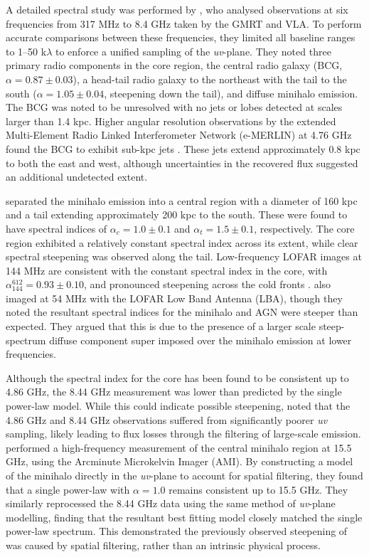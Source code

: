 A detailed spectral study was performed by \citet{Giacintucci2014a}, who analysed observations at six frequencies from 317 MHz to 8.4 GHz taken by the GMRT and VLA. To perform accurate comparisons between these frequencies, they limited all baseline ranges to 1--50 k$\lambda$ to enforce a unified sampling of the \textit{uv}-plane. They noted three primary radio components in the core region, the central radio galaxy (BCG, $\alpha = 0.87\pm0.03$), a head-tail radio galaxy to the northeast with the tail to the south ($\alpha = 1.05\pm0.04$, steepening down the tail), and diffuse minihalo emission. The BCG was noted to be unresolved with no jets or lobes detected at scales larger than 1.4 kpc. Higher angular resolution observations by the extended Multi-Element Radio Linked Interferometer Network (e-MERLIN) at 4.76 GHz found the BCG to exhibit sub-kpc jets \citep{Perrott2023}. These jets extend approximately 0.8 kpc to both the east and west, although uncertainties in the recovered flux suggested an additional undetected extent. 

\citet{Giacintucci2014a} separated the minihalo emission into a central region with a diameter of 160 kpc and a tail extending approximately 200 kpc to the south. These were found to have spectral indices of $\alpha_c = 1.0\pm0.1$ and $\alpha_t = 1.5\pm0.1$, respectively. The core region exhibited a relatively constant spectral index across its extent, while clear spectral steepening was observed along the tail. Low-frequency LOFAR images at 144 MHz are consistent with the constant spectral index in the core, with $\alpha_{144}^{612}=0.93\pm0.10$, and pronounced steepening across the cold fronts \citep{Savini2019, Biava2021}. \citet{Biava2021} also imaged at 54 MHz with the LOFAR Low Band Antenna (LBA), though they noted the resultant spectral indices for the minihalo and AGN were steeper than expected. They argued that this is due to the presence of a larger scale steep-spectrum diffuse component super imposed over the minihalo emission at lower frequencies. 

Although the spectral index for the core has been found to be consistent up to 4.86 GHz, the 8.44 GHz measurement was lower than predicted by the single power-law model. While this could indicate possible steepening, \citet{Giacintucci2014} noted that the 4.86 GHz and 8.44 GHz observations suffered from significantly poorer \textit{uv} sampling, likely leading to flux losses through the filtering of large-scale emission. \citet{Perrott2021} performed a high-frequency measurement of the central minihalo region at 15.5 GHz, using the Arcminute Microkelvin Imager (AMI). By constructing a model of the minihalo directly in the \textit{uv}-plane to account for spatial filtering, they found that a single power-law with $\alpha = 1.0$ remains consistent up to 15.5 GHz. They similarly reprocessed the 8.44 GHz data using the same method of \textit{uv}-plane modelling, finding that the resultant best fitting model closely matched the single power-law spectrum. This demonstrated the previously observed steepening of \citet{Giacintucci2014} was caused by spatial filtering, rather than an intrinsic physical process. 

